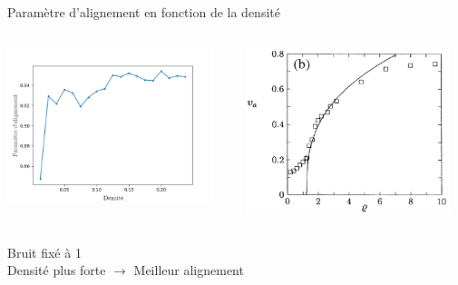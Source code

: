 \documentclass[aspectratio=43, a4paper, 12pt]{beamer}
\begin{document}
\begin{frame}{Paramètre d'alignement en fonction de la densité}
	\begin{columns}
	\begin{column}{0.5\paperwidth}
 		\begin{center}\includegraphics[width=6cm]{images/densite_1[noise=1]2.png}\end{center}
   	\end{column}
	\begin{column}{0.5\paperwidth}
 		\begin{center}\includegraphics[width=6cm]{images/densite_vicsek.png}\end{center}
   	\end{column}
	\end{columns}

	\begin{center} Bruit fixé à 1 \\ Densité plus forte $\rightarrow$ Meilleur alignement \end{center}
\end{frame}
\end{document}
